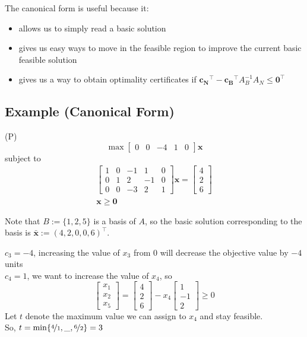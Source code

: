 The canonical form is useful because it:
\begin{itemize}
    \item allows us to simply read a basic solution
    \item gives us easy ways to move in the feasible region to improve the current basic
    feasible solution
    \item gives us a way to obtain optimality certificates if
    $\mathbf{c_N}^\top -\mathbf{c_B}^\top A_B^{-1}A_N\le \mathbf{0}^\top $
\end{itemize}

\subsection{Example (Canonical Form)}
(P)
\[\max \begin{bmatrix}
    0 & 0 & -4 & 1 & 0
\end{bmatrix}\mathbf{x}\]
subject to
\begin{align*}
    \begin{bmatrix}
        1 & 0 & -1 & 1 & 0\\
        0 & 1 & 2 & -1 & 0\\
        0 & 0 & -3 & 2 & 1
    \end{bmatrix}\mathbf{x}
    =
    \begin{bmatrix}
        4\\
        2\\
        6
    \end{bmatrix}\\
    \mathbf{x}\ge \mathbf{0}
\end{align*}


Note that $B:=\{1,2,5\}$ is a basis of $A$, so the basic solution corresponding to the
basis is
$\mathbf{\bar{x}}:=(4,2,0,0,6)^\top$.

$c_3=-4$, increasing the value of $x_3$ from $0$ will decrease the objective value by $-4$ units\\
$c_4=1$, we want to increase the value of $x_4$, so
\[
    \begin{bmatrix}
        x_1\\
        x_2\\
        x_5
    \end{bmatrix}
    =
    \begin{bmatrix}
        4\\
        2\\
        6
    \end{bmatrix}
    -x_4
    \begin{bmatrix}
        1\\
        -1\\
        2
    \end{bmatrix}
    \ge 0
\]
Let $t$ denote the maximum value we can assign to $x_4$ and stay feasible.\\
So,
$t=\min\{\nicefrac{4}{1},\_,\nicefrac{6}{2}\}=3$